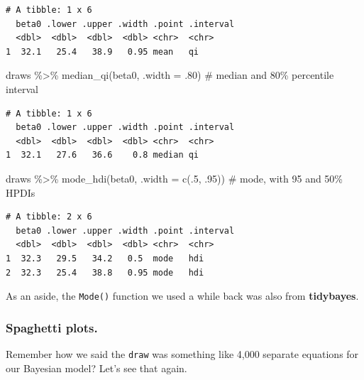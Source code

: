 \documentclass[
  letterpaper,
  DIV=11,
  numbers=noendperiod]{scrartcl}
\newenvironment{Shaded}{\begin{snugshade}}{\end{snugshade}}
\newcommand{\AttributeTok}[1]{\textcolor[rgb]{0.40,0.45,0.13}{#1}}
\newcommand{\CommentTok}[1]{\textcolor[rgb]{0.37,0.37,0.37}{#1}}
\newcommand{\DecValTok}[1]{\textcolor[rgb]{0.68,0.00,0.00}{#1}}
\newcommand{\FunctionTok}[1]{\textcolor[rgb]{0.28,0.35,0.67}{#1}}
\newcommand{\NormalTok}[1]{\textcolor[rgb]{0.00,0.23,0.31}{#1}}
\newcommand{\SpecialCharTok}[1]{\textcolor[rgb]{0.37,0.37,0.37}{#1}}
\begin{document}
\begin{verbatim}
# A tibble: 1 x 6
  beta0 .lower .upper .width .point .interval
  <dbl>  <dbl>  <dbl>  <dbl> <chr>  <chr>    
1  32.1   25.4   38.9   0.95 mean   qi       
\end{verbatim}

\begin{Shaded}
\begin{Highlighting}[]
\NormalTok{draws }\SpecialCharTok{\%\textgreater{}\%} \FunctionTok{median\_qi}\NormalTok{(beta0, }\AttributeTok{.width =}\NormalTok{ .}\DecValTok{80}\NormalTok{)        }\CommentTok{\# median and 80\% percentile interval}
\end{Highlighting}
\end{Shaded}

\begin{verbatim}
# A tibble: 1 x 6
  beta0 .lower .upper .width .point .interval
  <dbl>  <dbl>  <dbl>  <dbl> <chr>  <chr>    
1  32.1   27.6   36.6    0.8 median qi       
\end{verbatim}

\begin{Shaded}
\begin{Highlighting}[]
\NormalTok{draws }\SpecialCharTok{\%\textgreater{}\%} \FunctionTok{mode\_hdi}\NormalTok{(beta0, }\AttributeTok{.width =} \FunctionTok{c}\NormalTok{(.}\DecValTok{5}\NormalTok{, .}\DecValTok{95}\NormalTok{))  }\CommentTok{\# mode, with 95 and 50\% HPDI\textquotesingle{}s}
\end{Highlighting}
\end{Shaded}

\begin{verbatim}
# A tibble: 2 x 6
  beta0 .lower .upper .width .point .interval
  <dbl>  <dbl>  <dbl>  <dbl> <chr>  <chr>    
1  32.3   29.5   34.2   0.5  mode   hdi      
2  32.3   25.4   38.8   0.95 mode   hdi      
\end{verbatim}

As an aside, the \texttt{Mode()} function we used a while back was also
from \textbf{tidybayes}.

\subsubsection{Spaghetti plots.}\label{spaghetti-plots.}

Remember how we said the \texttt{draw} was something like 4,000 separate
equations for our Bayesian model? Let's see that again.
\end{document}

